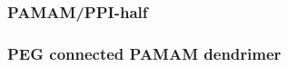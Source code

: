 \documentclass[12pt]{article}
\begin{document}
\subsubsection{PAMAM/PPI-half}

\clearpage

\subsubsection{PEG connected PAMAM dendrimer}

\clearpage

\end{document}
